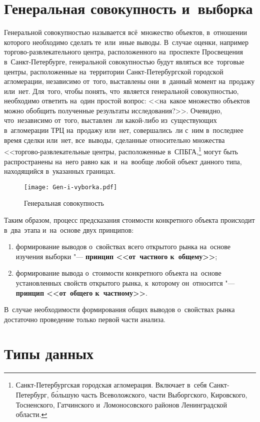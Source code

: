 \documentclass[]{scrartcl}
\begin{document}
\section{Генеральная совокупность и~выборка}
Генеральной совокупностью называется всё~множество объектов, в~отношении которого необходимо сделать те~или~иные выводы. В~случае оценки, например торгово-развлекательного центра, расположенного на~проспекте Просвещения в~Санкт-Петербурге, генеральной совокупностью будут являться все~торговые центры, расположенные на~территории Санкт-Петербургской городской агломерации, независимо от~того, выставлены они~в~данный момент на~продажу или~нет. Для~того, чтобы понять, что~является генеральной совокупностью, необходимо ответить на~один простой вопрос: <<на~какое множество объектов можно обобщить полученные результаты исследования?>>. Очевидно, что~независимо от~того, выставлен~ли какой-либо из~существующих в~агломерации ТРЦ на~продажу или~нет, совершались~ли с~ним в~последнее время сделки или~нет, все~выводы, сделанные относительно множества <<торгово-развлекательные центры, расположенные в~СПБГА,\footnote{Санкт-Петербургская городская агломерация. Включает в~себя Санкт-Петербург, б\'ольшую часть Всеволожского, части Выборгского, Кировского, Тосненского, Гатчинского и~Ломоносовского районов Ленинградской области.} могут быть распространены на~него равно как~и~на~вообще любой объект данного типа, находящийся в~указанных границах.
 
\begin{figure}[ht]
\centering %
\texttt{[image: Gen-i-vyborka.pdf]}
\caption{Генеральная совокупность}\label{fig:Gen-sovokup}
\end{figure}

	
Таким образом, процесс предсказания стоимости конкретного объекта происходит в~два~этапа и~на~основе двух принципов:
\begin{enumerate}
	\item формирование выводов о~свойствах всего открытого рынка на~основе изучения выборки "--- \textbf{принцип <<от~частного к~общему>>};
	\item формирование вывода о~стоимости конкретного объекта на~основе установленных свойств открытого рынка, к~которому он~относится "--- \textbf{принцип <<от~общего к~частному>>}.
\end{enumerate}
В~случае необходимости формирования общих выводов о~свойствах рынка достаточно проведение только первой части анализа. 
\section{Типы данных}
\end{document}
